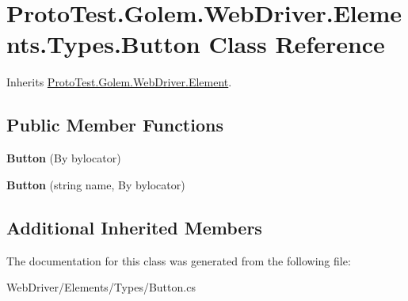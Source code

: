 \hypertarget{class_proto_test_1_1_golem_1_1_web_driver_1_1_elements_1_1_types_1_1_button}{\section{Proto\-Test.\-Golem.\-Web\-Driver.\-Elements.\-Types.\-Button Class Reference}
\label{class_proto_test_1_1_golem_1_1_web_driver_1_1_elements_1_1_types_1_1_button}
}


Inherits \hyperlink{class_proto_test_1_1_golem_1_1_web_driver_1_1_element}{Proto\-Test.\-Golem.\-Web\-Driver.\-Element}.

\subsection*{Public Member Functions}
\begin{DoxyCompactItemize}
\item 
\hypertarget{class_proto_test_1_1_golem_1_1_web_driver_1_1_elements_1_1_types_1_1_button_ab290bb1f66cec5b3cdf51148053b82ac}{{\bfseries Button} (By bylocator)}\label{class_proto_test_1_1_golem_1_1_web_driver_1_1_elements_1_1_types_1_1_button_ab290bb1f66cec5b3cdf51148053b82ac}

\item 
\hypertarget{class_proto_test_1_1_golem_1_1_web_driver_1_1_elements_1_1_types_1_1_button_a87a4ee44341968497996fd1def6204bb}{{\bfseries Button} (string name, By bylocator)}\label{class_proto_test_1_1_golem_1_1_web_driver_1_1_elements_1_1_types_1_1_button_a87a4ee44341968497996fd1def6204bb}

\end{DoxyCompactItemize}
\subsection*{Additional Inherited Members}


The documentation for this class was generated from the following file\-:\begin{DoxyCompactItemize}
\item 
Web\-Driver/\-Elements/\-Types/Button.\-cs\end{DoxyCompactItemize}
